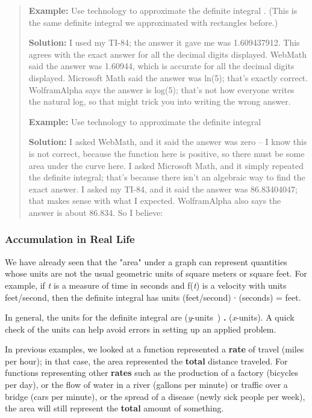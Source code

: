 \begin{quote}
\textbf{Example:} Use technology to approximate the definite integral .
(This is the same definite integral we approximated with rectangles
before.)

\textbf{Solution:} I used my TI-84; the answer it gave me was
1.609437912. This agrees with the exact answer for all the decimal
digits displayed. WebMath said the answer was 1.60944, which is accurate
for all the decimal digits displayed. Microsoft Math said the answer was
ln(5); that's exactly correct. Wolfram\textbar{}Alpha says the answer is
log(5); that's not how everyone writes the natural log, so that might
trick you into writing the wrong answer.

\textbf{Example:} Use technology to approximate the definite integral

\textbf{Solution:} I asked WebMath, and it said the answer was zero -- I
know this is not correct, because the function here is positive, so
there must be some area under the curve here. I asked Microsoft Math,
and it simply repeated the definite integral; that's because there isn't
an algebraic way to find the exact answer. I asked my TI-84, and it said
the answer was 86.83404047; that makes sense with what I expected.
Wolfram\textbar{}Alpha also says the answer is about 86.834. So I
believe:
\end{quote}

\subsubsection{}\label{section-5}

\subsubsection{Accumulation in Real
Life}\label{accumulation-in-real-life}

We have already seen that the "area" under a graph can represent
quantities whose units are not the usual geometric units of square
meters or square feet. For example, if \emph{t} is a measure of time in
seconds and f(\emph{t}) is a velocity with units feet/second, then the
definite integral has units (feet/second) ∙ (seconds) = feet.

In general, the units for the definite integral are (\emph{y}-units~)
\textbf{.} (\emph{x}-units). A quick check of the units can help avoid
errors in setting up an applied problem.

In previous examples, we looked at a function represented a
\textbf{rate} of travel (miles per hour); in that case, the area
represented the \textbf{total} distance traveled. For functions
representing other \textbf{rates} such as the production of a factory
(bicycles per day), or the flow of water in a river (gallons per minute)
or traffic over a bridge (cars per minute), or the spread of a disease
(newly sick people per week), the area will still represent the
\textbf{total} amount of something.

